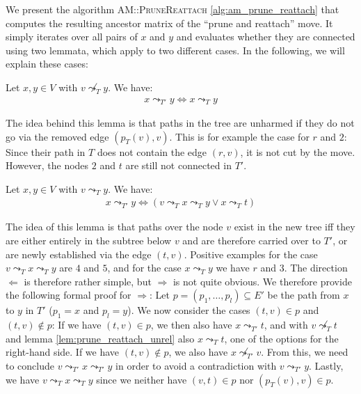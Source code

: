 We present the algorithm \textsc{AM::PruneReattach} \ref{alg:am_prune_reattach} that computes the resulting ancestor matrix of the ``prune and reattach'' move. It simply iterates over all pairs of $x$ and $y$ and evaluates whether they are connected using two lemmata, which apply to two different cases. In the following, we will explain these cases:

\begin{lemma}
    \label{lem:prune_reattach_unrel}
    Let $x, y \in V$ with $v \not\leadsto_T y$. We have:
    \begin{align*}
        x \leadsto_{T'} y \Leftrightarrow x \leadsto_T y
    \end{align*}
\end{lemma}

The idea behind this lemma is that paths in the tree are unharmed if they do not go via the removed edge $(p_T(v), v)$. This is for example the case for $r$ and $2$: Since their path in $T$ does not contain the edge $(r,v)$, it is not cut by the move. However, the nodes $2$ and $t$ are still not connected in $T'$.

\begin{lemma}
    \label{lem:prune_reattach_rel}
    Let $x, y \in V$ with $v \leadsto_T y$. We have:
    \begin{align*}
        x \leadsto_{T'} y \Leftrightarrow (v \leadsto_T x \leadsto_T y \vee x \leadsto_T t)
    \end{align*}
\end{lemma}

The idea of this lemma is that paths over the node $v$ exist in the new tree iff they are either entirely in the subtree below $v$ and are therefore carried over to $T'$, or are newly established via the edge $(t, v)$. Positive examples for the case $v \leadsto_T x \leadsto_T y$ are $4$ and $5$, and for the case $x \leadsto_T y$ we have $r$ and $3$. The direction $\Leftarrow$ is therefore rather simple, but $\Rightarrow$ is not quite obvious. We therefore provide the following formal proof for $\Rightarrow$: Let $p = (p_1, \dots, p_l) \subseteq E'$ be the path from $x$ to $y$ in $T'$ ($p_1 = x$ and $p_l = y$). We now consider the cases $(t,v) \in p$ and $(t,v) \notin p$: If we have $(t, v) \in p$, we then also have $x \leadsto_{T'} t$, and with $v \not\leadsto_T t$ and lemma \ref{lem:prune_reattach_unrel} also $x \leadsto_T t$, one of the options for the right-hand side. If we have $(t, v) \notin p$, we also have $x \not\leadsto_{T'} v$. From this, we need to conclude $v \leadsto_{T'} x \leadsto_{T'} y$ in order to avoid a contradiction with $v \leadsto_{T'} y$. Lastly, we have $v \leadsto_T x \leadsto_T y$ since we neither have $(v, t) \in p$ nor $(p_T(v), v) \in p$.

